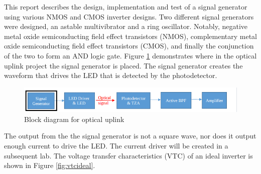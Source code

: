






\noindent This report describes the design, implementation and test of a signal generator using various NMOS and CMOS inverter designs. Two different signal generators were designed, an astable multivibrator and a ring oscillator. Notably,  negative metal oxide semiconducting field effect transistors (NMOS), complementary metal oxide semiconducting field effect transistors (CMOS), and finally the conjunction of the two to form an AND logic gate. Figure \ref{fig:blockdiagram2} demonstrates where in the optical uplink project the signal generator is placed. The signal generator creates the waveform that drives the LED that is detected by the photodetector. 



\begin{figure}[H]
    \centering
    \includegraphics[width=.9\textwidth ]{Introduction/Block_Diagram_MFBP.png}
    \caption{Block diagram for optical uplink \cite{b1}}
    \label{fig:blockdiagram2}
\end{figure}

The output from the the signal generator is not a square wave, nor does it output enough current to drive the LED. The current driver will be created in a subsequent lab. The voltage transfer characteristics (VTC) of an ideal inverter is shown in Figure \ref{fig:vtcideal}.

